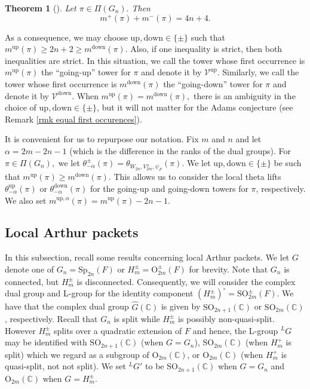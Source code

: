 \documentclass[11pt,letterpaper]{amsart}
\newcommand{\up}{{\mathrm{up}}}
\newcommand{\down}{{\mathrm{down}}}
\newcommand{\SO}{\mathrm{SO}}
\newcommand{\OO}{\mathrm{O}}
\newcommand{\Sp}{\mathrm{Sp}}
\newcommand{\BC}{\mathbb{C}}
\newtheorem{thm}{Theorem}[section]
\numberwithin{equation}{section}
\begin{document}
\begin{thm}[{\cite{SZ15}}]\label{thm conservation relation}
    Let $\pi\in\Pi(G_n).$ Then
    $$
    m^{+}(\pi)+m^{-}(\pi)=4n+4.
    $$
\end{thm}

As a consequence, we may choose $\up, \down\in\{\pm\}$ such that $m^{\up}(\pi)\geq 2n+2\geq m^{\down}(\pi).$ Also, if one inequality is strict, then both inequalities are strict. In this situation, we call the tower whose first occurrence is $m^{\up}(\pi)$ the ``going-up'' tower for $\pi$ and denote it by $\mathcal{V}^{\up}.$ Similarly, we call the tower whose first occurrence is $m^{\down}(\pi)$ the ``going-down'' tower for $\pi$ and denote it by $\mathcal{V}^{\down}.$ 
When $m^{\up}(\pi)=m^{\down}(\pi),$ there is an ambiguity in the choice of $\up,\down\in\{\pm\}$, but it will not matter for the Adams conjecture (see Remark \ref{rmk equal first occurences}).

It is convenient for us to repurpose our notation. Fix $m$ and $n$ and let $\alpha=2m-2n-1$ (which is the difference in the ranks of the dual groups). For $\pi\in\Pi(G_n),$ we let $\theta_{-\alpha}^{\pm}(\pi)=\theta_{W_{2n},V_{2m}^\pm,\psi_F}(\pi).$ We let $\up, \down\in\{\pm\}$ be such that $m^{\up}(\pi)\geq m^{\down}(\pi).$ This allows us to consider the local theta lifts $\theta_{-\alpha}^{\up}(\pi)$ or $\theta_{-\alpha}^{\down}(\pi)$ for the going-up and going-down towers for $\pi$, respectively. We also set $m^{\up, \alpha}(\pi)=m^{\up}(\pi)-2n-1.$



\subsection{Local Arthur packets}\label{sec local Arthur packets}

In this subsection, recall some results concerning local Arthur packets. We let $G$ denote one of $G_n=\Sp_{2n}(F)$ or $H_m^\pm=\OO^\pm_{2m}(F)$ for brevity. Note that $G_n$ is connected, but $H_m^\pm$ is disconnected. Consequently, we will consider the complex dual group and L-group for the identity component  $(H_m^\pm)^\circ=\SO_{2m}^\pm(F).$ We have that
the complex dual group $\widehat{G}(\BC)$ is given by $\SO_{2n+1}(\BC)$ or $\SO_{2m}(\BC)$, respectively. Recall that $G_n$ is split while $H_m^\pm$ is  possibly non-quasi-split. However $H_m^\pm$ splits over a quadratic extension of $F$ and hence, the L-group ${}^LG$ may be identified with $\SO_{2n+1}(\BC)$ (when $G=G_n$), $\SO_{2m}(\BC)$ (when $H_m^+$ is split) which we regard as a subgroup of $\OO_{2m}(\BC)$, or $\OO_{2m}(\BC)$ (when $H_m^+$ is quasi-split, not not split). We set ${}^LG'$ to be $\SO_{2n+1}(\BC)$ when $G=G_n$ and $\OO_{2m}(\BC)$ when $G=H_m^\pm$.
\end{document}
